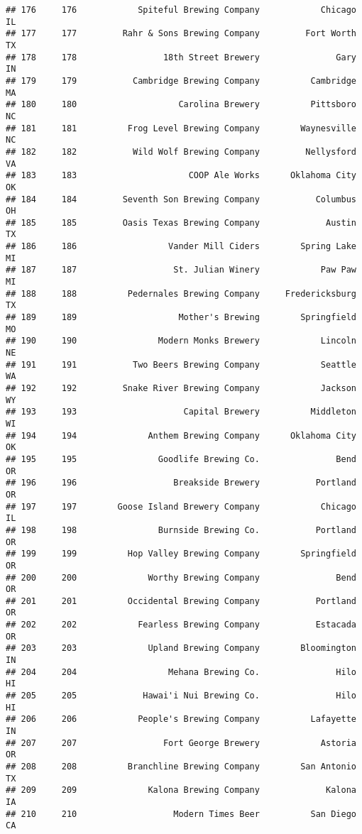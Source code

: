 \documentclass[
]{article}
\begin{document}
\begin{verbatim}
## 176     176            Spiteful Brewing Company            Chicago    IL
## 177     177         Rahr & Sons Brewing Company         Fort Worth    TX
## 178     178                 18th Street Brewery               Gary    IN
## 179     179           Cambridge Brewing Company          Cambridge    MA
## 180     180                    Carolina Brewery          Pittsboro    NC
## 181     181          Frog Level Brewing Company        Waynesville    NC
## 182     182           Wild Wolf Brewing Company         Nellysford    VA
## 183     183                      COOP Ale Works      Oklahoma City    OK
## 184     184         Seventh Son Brewing Company           Columbus    OH
## 185     185         Oasis Texas Brewing Company             Austin    TX
## 186     186                  Vander Mill Ciders        Spring Lake    MI
## 187     187                   St. Julian Winery            Paw Paw    MI
## 188     188          Pedernales Brewing Company     Fredericksburg    TX
## 189     189                    Mother's Brewing        Springfield    MO
## 190     190                Modern Monks Brewery            Lincoln    NE
## 191     191           Two Beers Brewing Company            Seattle    WA
## 192     192         Snake River Brewing Company            Jackson    WY
## 193     193                     Capital Brewery          Middleton    WI
## 194     194              Anthem Brewing Company      Oklahoma City    OK
## 195     195                Goodlife Brewing Co.               Bend    OR
## 196     196                   Breakside Brewery           Portland    OR
## 197     197        Goose Island Brewery Company            Chicago    IL
## 198     198                Burnside Brewing Co.           Portland    OR
## 199     199          Hop Valley Brewing Company        Springfield    OR
## 200     200              Worthy Brewing Company               Bend    OR
## 201     201          Occidental Brewing Company           Portland    OR
## 202     202            Fearless Brewing Company           Estacada    OR
## 203     203              Upland Brewing Company        Bloomington    IN
## 204     204                  Mehana Brewing Co.               Hilo    HI
## 205     205             Hawai'i Nui Brewing Co.               Hilo    HI
## 206     206            People's Brewing Company          Lafayette    IN
## 207     207                 Fort George Brewery            Astoria    OR
## 208     208          Branchline Brewing Company        San Antonio    TX
## 209     209              Kalona Brewing Company             Kalona    IA
## 210     210                   Modern Times Beer          San Diego    CA

\end{verbatim}
\end{document}
